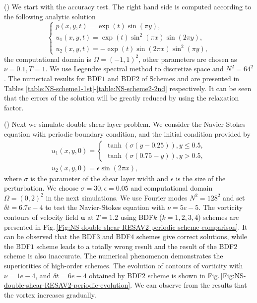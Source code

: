 \documentclass[final,review,onefignum,onetabnum]{siamart190516}
\theoremstyle{plain}
\begin{document}
() 
We start with the accuracy test. The right hand side is computed according to the following 
analytic solution
\begin{equation}
\left\{\begin{array}{l}
p(x, y, t)=\exp (t)\sin (\pi y), \\ 
u_{1}(x, y, t)=\exp (t) \sin ^{2}(\pi x) \sin (2 \pi y), \\ 
u_{2}(x, y, t)=-\exp (t) \sin (2 \pi x) \sin ^{2}(\pi y),
\end{array}\right.
\end{equation}
the computational domain is $\Omega=(-1, 1)^{2}$, other parameters are chosen as $\nu=0.1, T=1$. 
We use Legendre spectral method to discretize space and $N^2=64^2$. 
The numerical results for BDF$1$ and BDF$2$ of Schemes \uppercase\expandafter{} and  \uppercase\expandafter{} are presented in Tables \ref{table:NS-scheme1-1st}-\ref{table:NS-scheme2-2nd} respectively.
It can be seen that the errors of the solution will be greatly reduced by using the relaxation factor. 

()  Next we simulate double shear layer problem. 
We consider the Navier-Stokes equation with periodic boundary condition, and the initial condition provided by 
\begin{equation}
	\begin{array}{l}u_{1}(x, y, 0)=\left\{\begin{array}{l}\tanh (\sigma(y-0.25)), y \leq 0.5, \\ 
	\tanh (\sigma(0.75-y)), y>0.5,
	\end{array}\right. \\ 
	u_{2}(x, y, 0)=\epsilon \sin (2 \pi x),
\end{array}
\end{equation}
where $\sigma$  is the parameter of the shear layer width and $\epsilon$ is the size of the perturbation. 
We choose $\sigma=30, \epsilon=0.05$ and computational domain $\Omega=(0, 2)^2$ in the next simulations. 
We use  Fourier modes $N^2=128^{2}$  and set $\delta t = 6.7e-4$ to test the Navier-Stokes equation with $\nu=5e-5$. 
The vorticity contours of velocity field $\mathbf{u}$ at $T = 1.2$ using BDF$k$ ($k=1, 2, 3, 4$) schemes are presented in Fig.\,\ref{Fig:NS-double-shear-RESAV2-periodic-scheme-comparison}. 
It can be observed that  the BDF$3$ and BDF$4$ schemes give correct solutions, while the BDF$1$ scheme leads to a totally wrong result and the result of the BDF$2$ scheme is also inaccurate. 
The numerical phenomenon demonstrates the  superiorities of high-order schemes. 
The evolution of contours of vorticity with $\nu  = 1e-4$, and $\delta t = 6e- 4$ obtained by BDF$2$ scheme is shown in Fig.\,\ref{Fig:NS-double-shear-RESAV2-periodic-evolution}. 
We can observe from the results that the vortex increases gradually.
\end{document}
